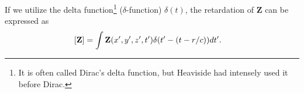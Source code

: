 \documentclass[11pt]{article}              %
\begin{document}




If we utilize the delta function\footnote{It is often called Dirac's delta function, but Heaviside had intensely used it before Dirac.} ($\delta$-function) 
 $\delta(t)$, the retardation of ${\mathbf Z}$ can be expressed as
\begin{align}
 [{\mathbf Z}]&=\int {\mathbf Z}(x^\prime,y^\prime,z^\prime,t^\prime) \delta(t^\prime-(t-r/c)) dt^\prime.\notag
\end{align}
\end{document}
